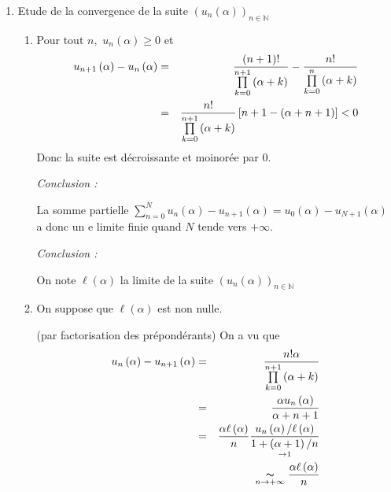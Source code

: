 \documentclass[a4paper, 11pt,reqno]{article}
\begin{document}
\begin{enumerate}
\item Etude de la convergence de la suite $\left( u_{n}\left( \alpha \right)
\right) _{n\in \mathbb{N}}$

\begin{enumerate}
\item Pour tout $n,$ $u_{n}\left( \alpha \right) \geq 0$ et 
\begin{eqnarray*}
u_{n+1}\left( \alpha \right) -u_{n}\left( \alpha \right)  &=&\frac{\left(
n+1\right) !}{\prod\limits_{k=0}^{n+1}\left( \alpha +k\right) }-\frac{n!}{%
\prod\limits_{k=0}^{n}\left( \alpha +k\right) } \\
&=&\frac{n!}{\prod\limits_{k=0}^{n+1}\left( \alpha +k\right) }\left[
n+1-\left( \alpha +n+1\right) \right] <0
\end{eqnarray*}%
Donc la suite est d\'{e}croissante et moinor\'{e}e par $0$.

\textsl{Conclusion : }

La somme partielle $\sum_{n=0}^{N}u_{n}\left( \alpha \right) -u_{n+1}\left(
\alpha \right) =u_{0}\left( \alpha \right) -u_{N+1}\left( \alpha \right) $ a
donc un e limite finie quand $N$ tende vers $+\infty .$

\textsl{Conclusion : }

On note $\ell \left( \alpha \right) $ la limite de la suite $\left(
u_{n}\left( \alpha \right) \right) _{n\in \mathbb{N}}$

\item On suppose que $\ell \left( \alpha \right) $ est non nulle. 

(par factorisation des pr\'{e}pond\'{e}rants) On a vu que 
\begin{eqnarray*}
u_{n}\left( \alpha \right) -u_{n+1}\left( \alpha \right)  &=&\frac{n!\alpha 
}{\prod\limits_{k=0}^{n+1}\left( \alpha +k\right) } \\
&=&\frac{\alpha u_{n}\left( \alpha \right) }{\alpha +n+1} \\
&=&\frac{\alpha \ell \left( \alpha \right) }{n}\underset{\rightarrow 1}{%
\frac{u_{n}\left( \alpha \right) /\ell \left( \alpha \right) }{1+\left(
\alpha +1\right) /n}} \\
&&\underset{n\rightarrow +\infty }{\thicksim }\frac{\alpha \ell \left(
\alpha \right) }{n}
\end{eqnarray*}


\end{enumerate}
\end{enumerate}
\end{document}
